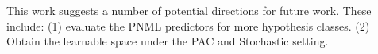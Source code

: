 \documentclass[conference,letterpaper]{IEEEtran}
\begin{document}
This work suggests a number of potential directions
for future work. These include: (1) evaluate the PNML predictors for more hypothesis classes. (2) Obtain the learnable space under the PAC and Stochastic setting.

\newpage



%
%




\end{document}

